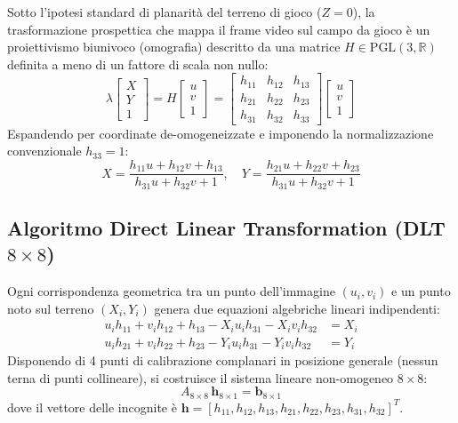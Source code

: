 \documentclass[11pt,a4paper]{article}
\begin{document}
Sotto l'ipotesi standard di planarità del terreno di gioco ($Z = 0$), la trasformazione prospettica che mappa il frame video sul campo da gioco è un proiettivismo biunivoco (omografia) descritto da una matrice $H \in \text{PGL}(3, \mathbb{R})$ definita a meno di un fattore di scala non nullo:
\begin{equation}
\lambda \begin{bmatrix} X \\ Y \\ 1 \end{bmatrix} = H \begin{bmatrix} u \\ v \\ 1 \end{bmatrix} = \begin{bmatrix} h_{11} & h_{12} & h_{13} \\ h_{21} & h_{22} & h_{23} \\ h_{31} & h_{32} & h_{33} \end{bmatrix} \begin{bmatrix} u \\ v \\ 1 \end{bmatrix}
\end{equation}
Espandendo per coordinate de-omogeneizzate e imponendo la normalizzazione convenzionale $h_{33} = 1$:
\begin{equation}
X = \frac{h_{11} u + h_{12} v + h_{13}}{h_{31} u + h_{32} v + 1}, \quad Y = \frac{h_{21} u + h_{22} v + h_{23}}{h_{31} u + h_{32} v + 1}
\end{equation}

\subsection{Algoritmo Direct Linear Transformation (DLT $8 \times 8$)}
Ogni corrispondenza geometrica tra un punto dell'immagine $(u_i, v_i)$ e un punto noto sul terreno $(X_i, Y_i)$ genera due equazioni algebriche lineari indipendenti:
\begin{equation}
\begin{aligned}
u_i h_{11} + v_i h_{12} + h_{13} - X_i u_i h_{31} - X_i v_i h_{32} &= X_i \\
u_i h_{21} + v_i h_{22} + h_{23} - Y_i u_i h_{31} - Y_i v_i h_{32} &= Y_i
\end{aligned}
\end{equation}
Disponendo di 4 punti di calibrazione complanari in posizione generale (nessun terna di punti collineare), si costruisce il sistema lineare non-omogeneo $8 \times 8$:
\begin{equation}
A_{8 \times 8} \, \mathbf{h}_{8 \times 1} = \mathbf{b}_{8 \times 1}
\end{equation}
dove il vettore delle incognite è $\mathbf{h} = [h_{11}, h_{12}, h_{13}, h_{21}, h_{22}, h_{23}, h_{31}, h_{32}]^T$.
\end{document}
